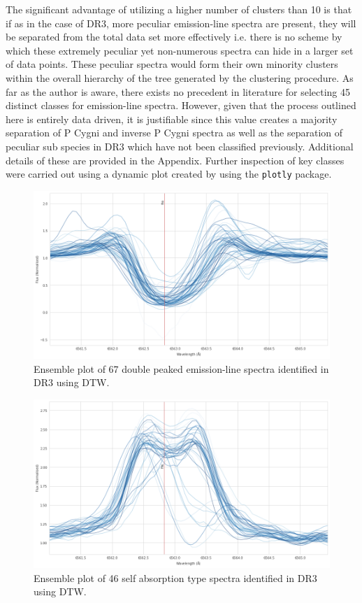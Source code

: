 The significant advantage of utilizing a higher number of clusters than 10 is that if as in the case of DR3, more peculiar emission-line spectra are present, they will be separated from the total data set more effectively i.e. there is no scheme by which these extremely peculiar yet non-numerous spectra can hide in a larger set of data points. These peculiar spectra would form their own minority clusters within the overall hierarchy of the tree generated by the clustering procedure. As far as the author is aware, there exists no precedent in literature for selecting 45 distinct classes for emission-line spectra. However, given that the process outlined here is entirely data driven, it is justifiable since this value creates a majority separation of P Cygni and inverse P Cygni spectra as well as the separation of peculiar sub species in DR3 which have not been classified previously. Additional details of these are provided in the Appendix. Further inspection of key classes were carried out using a dynamic plot created by using the \texttt{plotly} package.

\begin{figure}[!htb]
\centering
\includegraphics[scale=0.45]{figures/double peak 1.png}
\caption{Ensemble plot of 67 double peaked emission-line spectra identified in DR3 using DTW.}
\end{figure}

\begin{figure}[!htb]
\centering
\includegraphics[scale=0.45]{figures/emission on abs.png}
\caption{Ensemble plot of 46 self absorption type spectra identified in DR3 using DTW.}
\end{figure}

